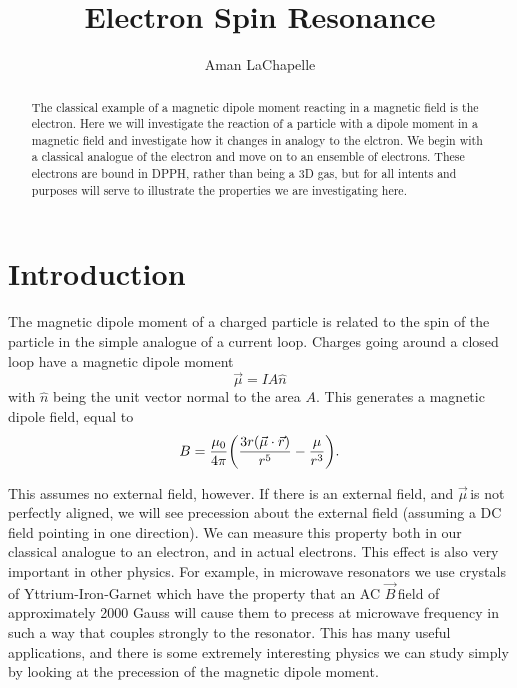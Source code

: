 \documentclass{article}
\title{Electron Spin Resonance}
\author{Aman LaChapelle}
\newcommand{\dipole}{$\vec{\mu}\,$}
\newcommand{\B}{$\vec{B}\,$}
\begin{document}
\raggedright
\maketitle

\begin{abstract}
	The classical example of a magnetic dipole moment reacting in a magnetic field is the electron.  Here we will investigate the reaction of a particle with a dipole moment in a magnetic field and investigate how it changes in analogy to the elctron.  We begin with a classical analogue of the electron and move on to an ensemble of electrons.  These electrons are bound in DPPH, rather than being a 3D gas, but for all intents and purposes will serve to illustrate the properties we are investigating here.
\end{abstract}

\tableofcontents
\newpage

\section{Introduction}
	The magnetic dipole moment of a charged particle is related to the spin of the particle in the simple analogue of a current loop.  Charges going around a closed loop have a magnetic dipole moment
	\begin{equation*}
		\vec{\mu} = IA\hat{n}
	\end{equation*}
	with $\hat{n}$ being the unit vector normal to the area $A$.  This generates a magnetic dipole field, equal to
	\begin{equation*}
		B = \frac{\mu_0}{4\pi}\bigg{(}\frac{3r(\vec{\mu} \cdot \vec{r})}{r^5} - \frac{\mu}{r^3}\bigg{)}.
	\end{equation*}

	This assumes no external field, however.  If there is an external field, and \dipole is not perfectly aligned, we will see precession about the external field (assuming a DC field pointing in one direction).  We can measure this property both in our classical analogue to an electron, and in actual electrons.  This effect is also very important in other physics.  For example, in microwave resonators we use crystals of Yttrium-Iron-Garnet which have the property that an AC \B field of approximately 2000 Gauss will cause them to precess at microwave frequency in such a way that couples strongly to the resonator.  This has many useful applications, and there is some extremely interesting physics we can study simply by looking at the precession of the magnetic dipole moment.
\end{document}
